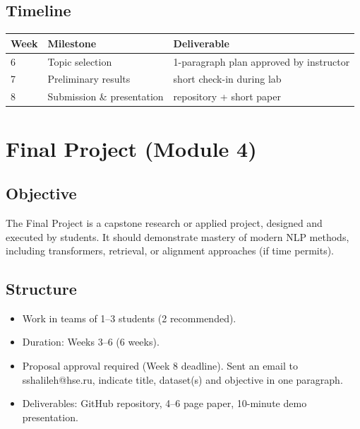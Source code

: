 \documentclass[12pt]{article}
\begin{document}
\subsection*{Timeline}
\begin{tabular}{lll}
\textbf{Week} & \textbf{Milestone} & \textbf{Deliverable}\\
\hline
6 & Topic selection & 1-paragraph plan approved by instructor \\
7 & Preliminary results & short check-in during lab \\
8 & Submission \& presentation & repository + short paper \\
\end{tabular}

\section{Final Project (Module 4)}
\subsection*{Objective}
The Final Project is a capstone research or applied project, designed and executed by students. It should demonstrate mastery of modern NLP methods, including transformers, retrieval, or alignment approaches (if time permits).

\subsection*{Structure}
\begin{itemize}[leftmargin=*]
  \item Work in teams of 1--3 students (2 recommended).
  \item Duration: Weeks 3--6 (6 weeks).
  \item Proposal approval required (Week 8 deadline). Sent an email to sshalileh@hse.ru, indicate title, dataset(s) and objective in one paragraph. 
  \item Deliverables: GitHub repository, 4--6 page paper, 10-minute demo presentation.
\end{itemize}
\end{document}
